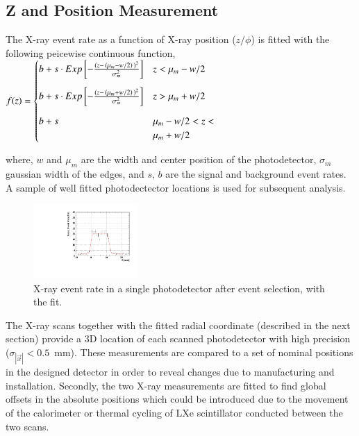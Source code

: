 \subsection{Z and \phis Position Measurement}\label{sec:mppcposition}
The X-ray event rate as a function of X-ray position ($z/\phi$) is
fitted with the following peicewise continuous function,\\
\begin{math}\label{eqn:mppcfitfcn}
f(z) = 
\begin{cases}
   b+s\cdot 
Exp\left[-\frac{(z - \, (\mu_m - w/2)\,)^2}{\sigma_m^2}\right] & z <
\mu_m-w/2  \vspace{3mm} \\
   b+s\cdot 
Exp\left[-\frac{(z - \, (\mu_m + w/2)\, )^2}{\sigma_m^2}\right] & z >
\mu_m+w/2    \vspace{3mm} \\
   b+s                                         & \mu_m - w/2 < z < \\
                                               & \mu_m + w/2    \\
\end{cases}
\end{math}

\noindent where, $w$ and $\mu_m$ are the width and center position of
the photodetector, $\sigma_m$ gaussian width of the edges, and $s,\,b$
are the signal and background event rates. A sample of well fitted
photodectector locations is used for  subsequent analysis.

\begin{figure}[h]
  \centering
  \includegraphics[width=4cm]{plots/2018/Sel5}
  \caption{X-ray event rate in a single photodetector after event selection,
    with the fit.
    }
  \label{fig:mppcfit}
\end{figure}  



The X-ray scans together with the fitted radial coordinate (described
in the next section) provide a 3D
location of each scanned photodetector  with high precision
($\sigma_{|\vec{x}|}<0.5$~mm).  These measurements are compared to a set of
nominal positions in the designed detector in order to reveal changes due to
manufacturing and installation.  Secondly, the two X-ray  measurements are
fitted to find global offsets in the absolute positions which could be
introduced due to the movement of the calorimeter or thermal cycling of LXe
scintillator conducted between the two scans.

